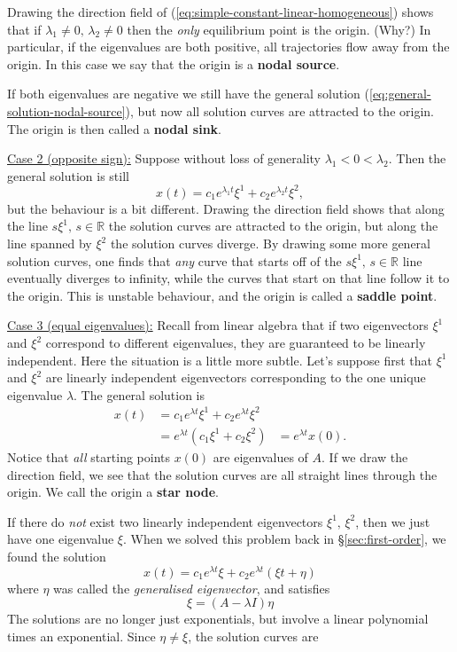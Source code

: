 \documentclass[11pt, letterpaper, oneside]{article}     %
\numberwithin{equation}{subsection}
\theoremstyle{definition}
\numberwithin{theorem}{section}
\theoremstyle{remark}
\newcommand{\RR}{\mathbb{R}}
\begin{document}
Drawing the direction field of (\ref{eq:simple-constant-linear-homogeneous}) shows that if $\lambda_1\neq0, \,\lambda_2\neq0$ then the \emph{only} equilibrium point is the origin. (Why?) In particular, if the eigenvalues are both positive, all trajectories flow away from the origin. In this case we say that the origin is a \textbf{nodal source}.

If both eigenvalues are negative we still have the general solution (\ref{eq:general-solution-nodal-source}), but now all solution curves are attracted to the origin. The origin is then called a \textbf{nodal sink}.

\noindent
\underline{Case 2 (opposite sign):} Suppose without loss of generality $\lambda_1 < 0 < \lambda_2$. Then the general solution is still
\begin{equation}\label{eq:general-solution-opposite-sign}
  x(t) = c_1e^{\lambda_1t}\xi^1 + c_2e^{\lambda_2t}\xi^2,
\end{equation}
but the behaviour is a bit different. Drawing the direction field shows that along the line $s\xi^1,\,s\in\RR$ the solution curves are attracted to the origin, but along the line spanned by $\xi^2$ the solution curves diverge. By drawing some more general solution curves, one finds that \emph{any} curve that starts off of the $s\xi^1,\,s\in\RR$ line eventually diverges to infinity, while the curves that start on that line follow it to the origin. This is unstable behaviour, and the origin is called a \textbf{saddle point}.

\noindent
\underline{Case 3 (equal eigenvalues):} Recall from linear algebra that if two eigenvectors $\xi^1$ and $\xi^2$ correspond to different eigenvalues, they are guaranteed to be linearly independent. Here the situation is a little more subtle. Let's suppose first that $\xi^1$ and $\xi^2$ are linearly independent eigenvectors corresponding to the one unique eigenvalue $\lambda$. The general solution is
\begin{align}
  x(t) &= c_1e^{\lambda t}\xi^1 + c_2e^{\lambda t}\xi^2\\
  &= e^{\lambda t}(c_1 \xi^1 + c_2\xi^2)
  &= e^{\lambda t}x(0).
\end{align}
Notice that \emph{all} starting points $x(0)$ are eigenvalues of $A$. If we draw the direction field, we see that the solution curves are all straight lines through the origin. We call the origin a \textbf{star node}.

If there do \emph{not} exist two linearly independent eigenvectors $\xi^1,\,\xi^2$, then we just have one eigenvalue $\xi$. When we solved this problem back in \S\ref{sec:first-order}, we found the solution
\begin{equation}
  x(t) = c_1e^{\lambda t}\xi + c_2e^{\lambda t}(\xi t + \eta)
\end{equation}
where $\eta$ was called the \emph{generalised eigenvector}, and satisfies
\begin{equation}
  \xi = (A - \lambda I)\eta
\end{equation}
The solutions are no longer just exponentials, but involve a linear polynomial times an exponential. Since $\eta \neq \xi$, the solution curves are
\end{document}
